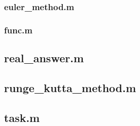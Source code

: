 \documentclass[a4paper,10pt,notitlepage,pdftex]{scrartcl}
\begin{document}
\subsubsection*{euler\_method.m}

\subsubsection*{func.m}

\subsection*{real\_answer.m}

\subsection*{runge\_kutta\_method.m}

\subsection*{task.m}
\end{document}
